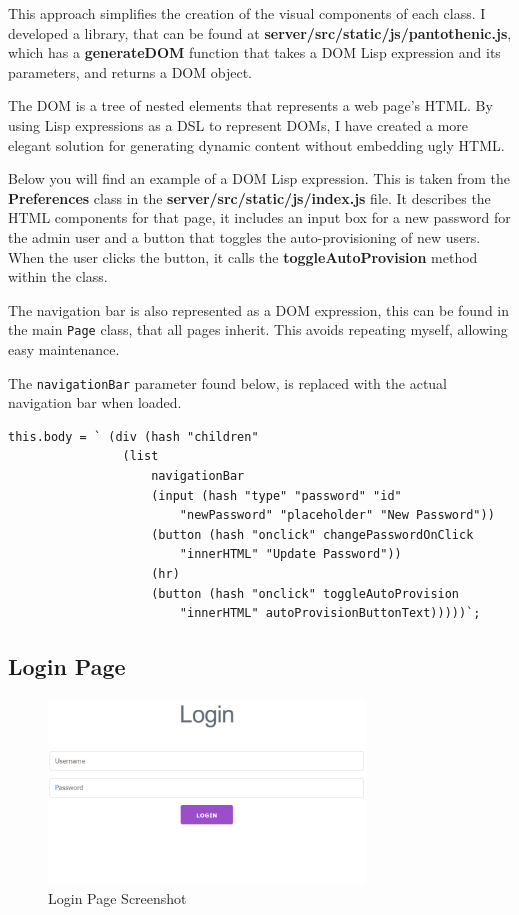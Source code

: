 This approach simplifies the creation of the visual components of each class.
I developed a library, that can be found at \textbf{server/src/static/js/pantothenic.js},
which has a \textbf{generateDOM} function that takes a
DOM Lisp expression and its parameters, and returns a DOM object.

The DOM is a tree of nested elements that represents a web page's HTML.
By using Lisp expressions as a DSL to represent DOMs,
I have created a more elegant solution for generating dynamic
content without embedding ugly HTML.

Below you will find an example of a DOM Lisp expression.
This is taken from the \textbf{Preferences} class in the
\textbf{server/src/static/js/index.js} file.
It describes the HTML components for that page,
it includes an input box for a new password for the admin user
and a button that toggles the auto-provisioning of new users.
When the user clicks the button, it calls the
\textbf{toggleAutoProvision} method within the class.

The navigation bar is also represented as a DOM expression,
this can be found in the main \texttt{Page} class,
that all pages inherit.
This avoids repeating myself, allowing easy maintenance.

The \texttt{navigationBar} parameter found below,
is replaced with the actual navigation bar when loaded.

\begin{lstlisting}
this.body = ` (div (hash "children"
                (list
                    navigationBar
                    (input (hash "type" "password" "id"
                        "newPassword" "placeholder" "New Password"))
                    (button (hash "onclick" changePasswordOnClick
                        "innerHTML" "Update Password"))
                    (hr)
                    (button (hash "onclick" toggleAutoProvision
                        "innerHTML" autoProvisionButtonText)))))`;
\end{lstlisting}

\subsection{Login Page}
\begin{figure}[h!]
    \centering
    \includegraphics[width=0.75\textwidth]{images/screenshots/login_page}
    \caption{Login Page Screenshot}
    \label{image:loginPageScreenshot}
\end{figure}

